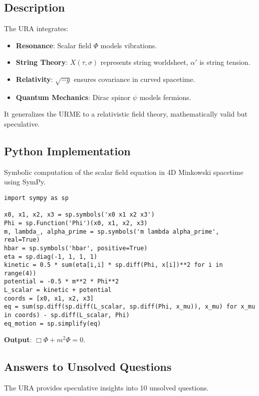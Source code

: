 \documentclass[12pt]{article}
\begin{document}
\subsection*{Description}
The URA integrates:
\begin{itemize}
    \item \textbf{Resonance}: Scalar field \(\Phi\) models vibrations.
    \item \textbf{String Theory}: \(X(\tau,\sigma)\) represents string worldsheet, \(\alpha'\) is string tension.
    \item \textbf{Relativity}: \(\sqrt{-g}\) ensures covariance in curved spacetime.
    \item \textbf{Quantum Mechanics}: Dirac spinor \(\psi\) models fermions.
\end{itemize}
It generalizes the URME to a relativistic field theory, mathematically valid but speculative.

\subsection*{Python Implementation}
Symbolic computation of the scalar field equation in 4D Minkowski spacetime using SymPy.

\begin{lstlisting}
import sympy as sp

x0, x1, x2, x3 = sp.symbols('x0 x1 x2 x3')
Phi = sp.Function('Phi')(x0, x1, x2, x3)
m, lambda_, alpha_prime = sp.symbols('m lambda alpha_prime', real=True)
hbar = sp.symbols('hbar', positive=True)
eta = sp.diag(-1, 1, 1, 1)
kinetic = 0.5 * sum(eta[i,i] * sp.diff(Phi, x[i])**2 for i in range(4))
potential = -0.5 * m**2 * Phi**2
L_scalar = kinetic + potential
coords = [x0, x1, x2, x3]
eq = sum(sp.diff(sp.diff(L_scalar, sp.diff(Phi, x_mu)), x_mu) for x_mu in coords) - sp.diff(L_scalar, Phi)
eq_motion = sp.simplify(eq)
\end{lstlisting}
\textbf{Output}: \(\Box \Phi + m^2 \Phi = 0\).

\subsection*{Answers to Unsolved Questions}
The URA provides speculative insights into 10 unsolved questions.
\end{document}
